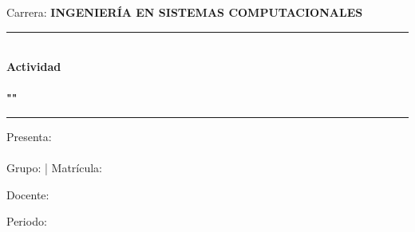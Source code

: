 \begin{titlepage}
\begin{center}
        \vspace{0.8cm}
        \large
        Carrera: \textbf{INGENIERÍA EN SISTEMAS COMPUTACIONALES}
        
        \vspace{0.8cm}
        \begin{center}
            \rule{\textwidth}{0.5pt} \\[0.4cm]
            {\large \textbf{Actividad}} \\[0.4cm]
            \descripcion \\ [0.4cm]
            \textbf{"\myActivity"} \\[0.4cm]
            \rule{\textwidth}{0.5pt}
        \end{center}
        \vspace{0.8cm}


        \vspace{0.8cm}
        \begin{minipage}{0.48\textwidth}
            \begin{flushleft}
                {\large
                    Presenta:\\    
                    \textbf{\authora}\\
                    Grupo: \textbf{\myGroup} | Matrícula: \textbf{\myControlNumber}
                }
            \end{flushleft}
        \end{minipage}
        \hfill
        \begin{minipage}{0.48\textwidth}
            \begin{flushright}
                {\large
                    Docente:\\
                    \textbf{\myReviewers}
                }
            \end{flushright}
        \end{minipage}
        
        \vfill
        
        {\large Periodo: \myPeriod}\\
        \vspace{0.3cm}
        {\large \myDate}
        
    \end{center}
\end{titlepage}
